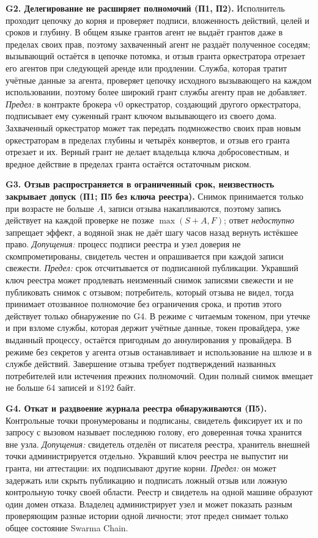 \documentclass[10pt,a4paper]{article}
\begin{document}
\textbf{G2. Делегирование не расширяет полномочий (П1, П2).} Исполнитель проходит цепочку до корня и проверяет подписи, вложенность действий, целей и сроков и глубину. В общем языке грантов агент не выдаёт грантов даже в пределах своих прав, поэтому захваченный агент не раздаёт полученное соседям; вызывающий остаётся в цепочке потомка, и отзыв гранта оркестратора отрезает его агентов при следующей аренде или продлении. Служба, которая тратит учётные данные за агента, проверяет цепочку исходного вызывающего на каждом использовании, поэтому более широкий грант службы агенту прав не добавляет. \emph{Предел:} в контракте брокера v0 оркестратор, создающий другого оркестратора, подписывает ему суженный грант ключом вызывающего из своего дома. Захваченный оркестратор может так передать подмножество своих прав новым оркестраторам в пределах глубины и четырёх конвертов, и отзыв его гранта отрезает и их. Верный грант не делает владельца ключа добросовестным, и вредное действие в пределах гранта остаётся остаточным риском.

\textbf{G3. Отзыв распространяется в ограниченный срок, неизвестность закрывает допуск (П1; П5 без ключа реестра).} Снимок принимается только при возрасте не больше $A$, записи отзыва накапливаются, поэтому запись действует на каждой проверке не позже $\max(S+A,F)$; ответ \emph{недоступно} запрещает эффект, а водяной знак не даёт шагу часов назад вернуть истёкшее право. \emph{Допущения:} процесс подписи реестра и узел доверия не скомпрометированы, свидетель честен и опрашивается при каждой записи свежести. \emph{Предел:} срок отсчитывается от подписанной публикации. Укравший ключ реестра может продлевать неизменный снимок записями свежести и не публиковать снимок с отзывом; потребитель, который отзыва не видел, тогда принимает отозванное полномочие без ограничения срока, и против этого действует только обнаружение по G4. В режиме с читаемым токеном, при утечке и при взломе службы, которая держит учётные данные, токен провайдера, уже выданный процессу, остаётся пригодным до аннулирования у провайдера. В режиме без секретов у агента отзыв останавливает и использование на шлюзе и в службе действий. Завершение отзыва требует подтверждений названных потребителей или истечения прежних полномочий. Один полный снимок вмещает не больше 64 записей и 8192 байт.

\textbf{G4. Откат и раздвоение журнала реестра обнаруживаются (П5).} Контрольные точки пронумерованы и подписаны, свидетель фиксирует их и по запросу с вызовом называет последнюю голову, его доверенная точка хранится вне узла. \emph{Допущения:} свидетель отделён от писателя реестра, хранитель внешней точки администрируется отдельно. Укравший ключ реестра не выпустит ни гранта, ни аттестации: их подписывают другие корни. \emph{Предел:} он может задержать или скрыть публикацию и подписать ложный отзыв или ложную контрольную точку своей области. Реестр и свидетель на одной машине образуют один домен отказа. Владелец администрирует узел и может показать разным проверяющим разные истории одной личности; этот предел снимает только общее состояние Swarma Chain.
\end{document}
